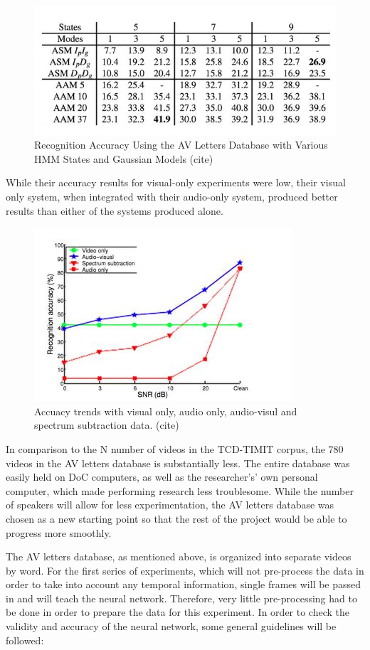\documentclass[12pt,twoside]{report}
\begin{document}
\begin{figure}[tb]
\centering
\includegraphics[width = 0.6\hsize]{./figures/avlettersaccuracy}
\caption{Recognition Accuracy Using the AV Letters Database with Various HMM States and Gaussian Models (cite)}
\label{fig:avletters2}
\end{figure} 

While their accuracy results for visual-only experiments were low, their visual only system, when integrated with their audio-only system, produced better results than either of the systems produced alone.

\begin{figure}[tb]
\centering
\includegraphics[width = 0.6\hsize]{./figures/accuracychartavletters}
\caption{Accuacy trends with visual only, audio only, audio-visul and spectrum subtraction data.  (cite)}
\label{fig:avletters2}
\end{figure} 

In comparison to the N number of videos in the TCD-TIMIT corpus, the 780 videos in the AV letters database is substantially less. The entire database was easily held on DoC computers, as well as the researcher's’ own personal computer, which made performing research less troublesome. While the number of speakers will allow for less experimentation, the AV letters database was chosen as a new starting point so that the rest of the project would be able to progress more smoothly.

The AV letters database, as mentioned above, is organized into separate videos by word. For the first series of experiments, which will not pre-process the data in order to take into account any temporal information, single frames will be passed in and will teach the neural network. Therefore, very little pre-processing had to be done in order to prepare the data for this experiment. In order to check the validity and accuracy of the neural network, some general guidelines will be followed: 
\end{document}
